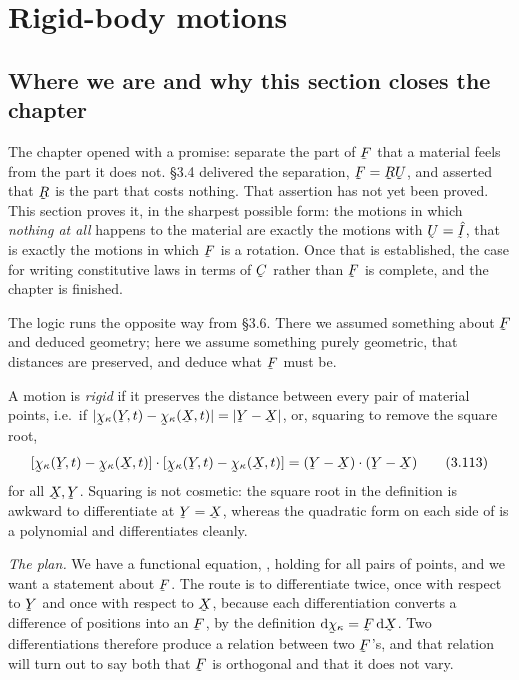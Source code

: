 \section{Rigid-body motions}\label{sec:rigid}

\subsection*{Where we are and why this section closes the chapter}

The chapter opened with a promise: separate the part of $\bF$ that a
material feels from the part it does not. \S3.4 delivered the separation,
$\bF=\bR\bU$, and asserted that $\bR$ is the part that costs nothing. That
assertion has not yet been proved. This section proves it, in the sharpest
possible form: the motions in which \emph{nothing at all} happens to the
material are exactly the motions with $\bU=\hI$, that is exactly the
motions in which $\bF$ is a rotation. Once that is established, the case
for writing constitutive laws in terms of $\bC$ rather than $\bF$ is
complete, and the chapter is finished.

The logic runs the opposite way from \S3.6. There we assumed something
about $\bF$ and deduced geometry; here we assume something purely
geometric, that distances are preserved, and deduce what $\bF$ must be.

A motion is \emph{rigid} if it preserves the distance between every pair of
material points, i.e.\ if
$|\bchi_{\kappa}(\bY,t)-\bchi_{\kappa}(\bX,t)|=|\bY-\bX|$, or, squaring to
remove the square root,
\begin{equation}
   \ip{[\bchi_{\kappa}(\bY,t)-\bchi_{\kappa}(\bX,t)]}
      {[\bchi_{\kappa}(\bY,t)-\bchi_{\kappa}(\bX,t)]}
   =\ip{(\bY-\bX)}{(\bY-\bX)}
   \tag{3.113}\label{eq:3.113}
\end{equation}
for all $\bX,\bY$. Squaring is not cosmetic: the square root in the
definition is awkward to differentiate at $\bY=\bX$, whereas the quadratic
form on each side of  is a polynomial and differentiates cleanly.

\emph{The plan.} We have a functional equation, , holding for all
pairs of points, and we want a statement about $\bF$. The route is to
differentiate twice, once with respect to $\bY$ and once with respect to
$\bX$, because each differentiation converts a difference of positions
into an $\bF$, by the definition $\dl\bchi_{\kappa}=\bF\,\dl\bX$. Two
differentiations therefore produce a relation between two $\bF$'s, and that
relation will turn out to say both that $\bF$ is orthogonal and that it
does not vary.

